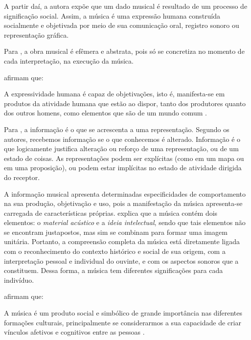 A partir daí, a autora  expõe que um dado musical é resultado de um processo de significação social. Assim, a música é uma expressão humana construída socialmente e objetivada por meio de sua comunicação oral, registro sonoro ou representação gráfica.

Para , a obra musical é efêmera e abstrata, pois só se concretiza no momento de cada interpretação, na execução da música. 

 afirmam que:

\begin{citacao}
A expressividade humana é capaz de objetivações, isto é, manifesta-se em produtos da atividade humana que estão ao dispor, tanto dos produtores quanto dos outros homens, como elementos que são de um mundo comum \cite{berger&luckmann2014}.
\end{citacao}

Para , a informação é o que se acrescenta a uma representação. Segundo os autores, recebemos informação se o que conhecemos é alterado. Informação é o que logicamente justifica alteração ou reforço de uma representação, ou de um estado de coisas. As representações podem ser explícitas (como em um mapa ou em uma proposição), ou podem estar implícitas no estado de atividade dirigida do receptor.

A informação musical apresenta determinadas especificidades de comportamento na sua produção, objetivação e uso, pois a manifestação da música apresenta-se carregada de características próprias.  explica que a música contém dois elementos: o \textit{material acústico} e a \textit{ideia intelectual}, sendo que tais elementos não se encontram justapostos, mas sim se combinam para formar uma imagem unitária. Portanto, a compreensão completa da música está diretamente ligada com o reconhecimento do contexto histórico e social de sua origem, com a interpretação pessoal e individual do ouvinte, e com os aspectos sonoros que a constituem. Dessa forma, a música tem diferentes significações para cada indivíduo.

 afirmam que:

\begin{citacao}
A música é um produto social e simbólico de grande importância nas diferentes formações culturais, principalmente se considerarmos a sua capacidade de criar vínculos afetivos e cognitivos entre as pessoas \cite{lima&santini2006}.
\end{citacao}

